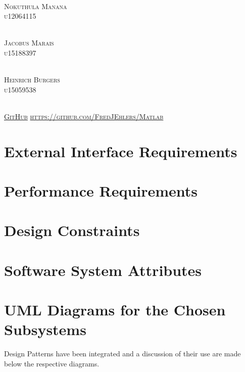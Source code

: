 \documentclass[runningheads,a4paper]{article}
\begin{document}
\begin{titlepage}
\begin{center}
\begin{multicols}{2}
				\textsc{\large\\
					 Nokuthula Manana\\
					u12064115\\
				}
				
				\textsc{\large\\
					Jacobus Marais\\
					u15188397\\
				}
				
				\textsc{\large\\
					Heinrich Burgers\\
					u15059538\\
				}
				
				
				
			\end{multicols}
			
			
			\textsc{	\\ \href{https://github.com/FredJEhlers/Matlab}{GitHub}
				\url{https://github.com/FredJEhlers/Matlab}}
			
		\end{center}
	\end{titlepage}

\begingroup

\tableofcontents
{}
\endgroup
\newpage


\section{External Interface Requirements}

\section{Performance Requirements}

\section{Design Constraints}

\section{Software System Attributes}

\section{UML Diagrams for the Chosen Subsystems}
Design Patterns have been integrated and a discussion of their use are made below the respective diagrams.
\end{document}
